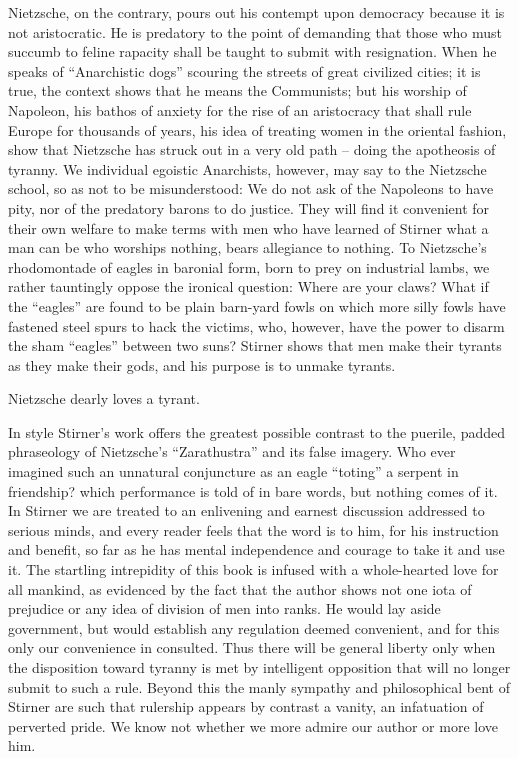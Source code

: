 \documentclass[12pt,a4paper]{book}
\begin{document}
Nietzsche, on the contrary, pours out his contempt upon democracy because it 
is not aristocratic. He is predatory to the point of demanding that those who 
must succumb to feline rapacity shall be taught to submit with resignation. 
When he speaks of ``Anarchistic dogs'' scouring the streets of great 
civilized cities; it is true, the context shows that he means the Communists; 
but his worship of Napoleon, his bathos of anxiety for the rise of an 
aristocracy that shall rule Europe for thousands of years, his idea of 
treating women in the oriental fashion, show that Nietzsche has struck out in 
a very old path -- doing the apotheosis of tyranny. We individual egoistic 
Anarchists, however, may say to the Nietzsche school, so as not to be 
misunderstood: We do not ask of the Napoleons to have pity, nor of the 
predatory barons to do justice. They will find it convenient for their own 
welfare to make terms with men who have learned of Stirner what a man can be 
who worships nothing, bears allegiance to nothing. To Nietzsche's rhodomontade 
of eagles in baronial form, born to prey on industrial lambs, we rather 
tauntingly oppose the ironical question: Where are your claws? What if the 
``eagles'' are found to be plain barn-yard fowls on which more silly fowls 
have fastened steel spurs to hack the victims, who, however, have the power to 
disarm the sham ``eagles'' between two suns? Stirner shows that men make 
their tyrants as they make their gods, and his purpose is to unmake tyrants.

Nietzsche dearly loves a tyrant.

In style Stirner's work offers the greatest possible contrast to the puerile, 
padded phraseology of Nietzsche's ``Zarathustra'' and its false imagery. Who 
ever imagined such an unnatural conjuncture as an eagle ``toting'' a serpent 
in friendship? which performance is told of in bare words, but nothing comes 
of it. In Stirner we are treated to an enlivening and earnest discussion 
addressed to serious minds, and every reader feels that the word is to him, 
for his instruction and benefit, so far as he has mental independence and 
courage to take it and use it. The startling intrepidity of this book is 
infused with a whole-hearted love for all mankind, as evidenced by the fact 
that the author shows not one iota of prejudice or any idea of division of men 
into ranks. He would lay aside government, but would establish any regulation 
deemed convenient, and for this only our convenience in consulted. Thus there 
will be general liberty only when the disposition toward tyranny is met by 
intelligent opposition that will no longer submit to such a rule. Beyond this 
the manly sympathy and philosophical bent of Stirner are such that rulership 
appears by contrast a vanity, an infatuation of perverted pride. We know not 
whether we more admire our author or more love him.
\end{document}
